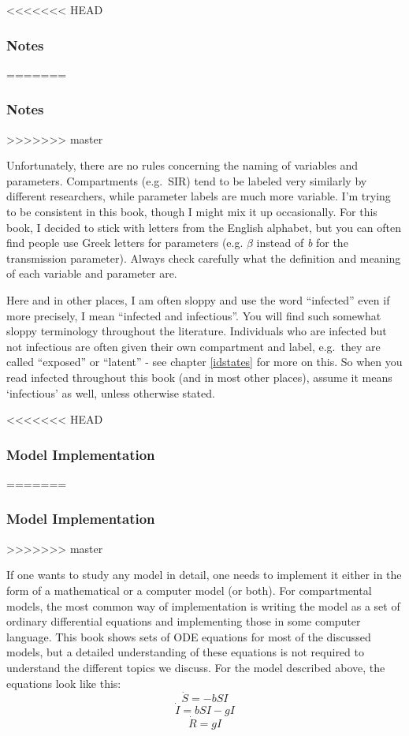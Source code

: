 \documentclass[]{book}
\theoremstyle{definition}
\theoremstyle{definition}
\theoremstyle{definition}
\theoremstyle{remark}
\begin{document}
<<<<<<< HEAD
\hypertarget{mynotebox}{%
\subsubsection{Notes}\label{mynotebox}}
=======
\subsubsection{Notes}\label{mynotebox}
>>>>>>> master

Unfortunately, there are no rules concerning the naming of variables and
parameters. Compartments (e.g.~SIR) tend to be labeled very similarly by
different researchers, while parameter labels are much more variable.
I'm trying to be consistent in this book, though I might mix it up
occasionally. For this book, I decided to stick with letters from the
English alphabet, but you can often find people use Greek letters for
parameters (e.g. \(\beta\) instead of \emph{b} for the transmission
parameter). Always check carefully what the definition and meaning of
each variable and parameter are.

Here and in other places, I am often sloppy and use the word
``infected'' even if more precisely, I mean ``infected and infectious''.
You will find such somewhat sloppy terminology throughout the
literature. Individuals who are infected but not infectious are often
given their own compartment and label, e.g.~they are called ``exposed''
or ``latent'' - see chapter \ref{idstates} for more on this. So when you
read infected throughout this book (and in most other places), assume it
means `infectious' as well, unless otherwise stated.

<<<<<<< HEAD
\hypertarget{myadvancedbox}{%
\subsubsection{Model Implementation}\label{myadvancedbox}}
=======
\subsubsection{Model Implementation}\label{myadvancedbox}
>>>>>>> master

If one wants to study any model in detail, one needs to implement it
either in the form of a mathematical or a computer model (or both). For
compartmental models, the most common way of implementation is writing
the model as a set of ordinary differential equations and implementing
those in some computer language. This book shows sets of ODE equations
for most of the discussed models, but a detailed understanding of these
equations is not required to understand the different topics we discuss.
For the model described above, the equations look like this:
\[\dot S = -bSI\] \[\dot I = bSI - gI\] \[\dot R = gI\]
\end{document}
